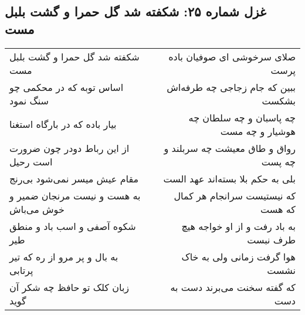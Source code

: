 \begin{center}
\section*{غزل شماره ۲۵: شکفته شد گل حمرا و گشت بلبل مست}
\label{sec:sh025}
\begin{longtable}{l p{0.5cm} r}
شکفته شد گل حمرا و گشت بلبل مست
&&
صلای سرخوشی ای صوفیان باده پرست
\\
اساس توبه که در محکمی چو سنگ نمود
&&
ببین که جام زجاجی چه طرفه‌اش بشکست
\\
بیار باده که در بارگاه استغنا
&&
چه پاسبان و چه سلطان چه هوشیار و چه مست
\\
از این رباط دودر چون ضرورت است رحیل
&&
رواق و طاق معیشت چه سربلند و چه پست
\\
مقام عیش میسر نمی‌شود بی‌رنج
&&
بلی به حکم بلا بسته‌اند عهد الست
\\
به هست و نیست مرنجان ضمیر و خوش می‌باش
&&
که نیستیست سرانجام هر کمال که هست
\\
شکوه آصفی و اسب باد و منطق طیر
&&
به باد رفت و از او خواجه هیچ طرف نبست
\\
به بال و پر مرو از ره که تیر پرتابی
&&
هوا گرفت زمانی ولی به خاک نشست
\\
زبان کلک تو حافظ چه شکر آن گوید
&&
که گفته سخنت می‌برند دست به دست
\\
\end{longtable}
\end{center}
